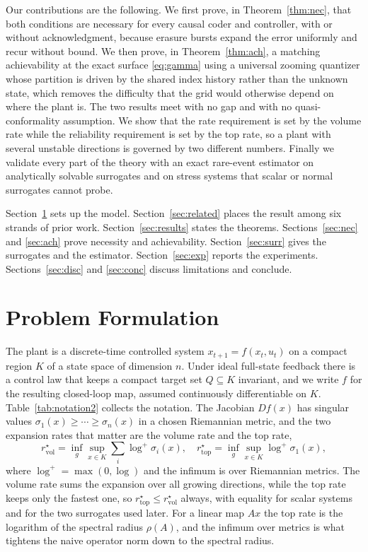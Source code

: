 \documentclass[journal]{IEEEtran}
\theoremstyle{definition}
\theoremstyle{remark}
\newcommand{\rvol}{r^\star_{\mathrm{vol}}}
\newcommand{\rtop}{r^\star_{\mathrm{top}}}
\begin{document}
Our contributions are the following. We first prove, in Theorem~\ref{thm:nec}, that both conditions are necessary
for every causal coder and controller, with or without acknowledgment, because erasure bursts expand the error
uniformly and recur without bound. We then prove, in Theorem~\ref{thm:ach}, a matching achievability at the exact
surface \eqref{eq:gamma} using a universal zooming quantizer whose partition is driven by the shared index
history rather than the unknown state, which removes the difficulty that the grid would otherwise depend on where
the plant is. The two results meet with no gap and with no quasi-conformality assumption. We show that the rate
requirement is set by the volume rate while the reliability requirement is set by the top rate, so a plant with
several unstable directions is governed by two different numbers. Finally we validate every part of the theory
with an exact rare-event estimator on analytically solvable surrogates and on stress systems that scalar or
normal surrogates cannot probe.

Section~\ref{sec:model} sets up the model. Section~\ref{sec:related} places the result among six strands of prior
work. Section~\ref{sec:results} states the theorems. Sections~\ref{sec:nec} and \ref{sec:ach} prove necessity and
achievability. Section~\ref{sec:surr} gives the surrogates and the estimator. Section~\ref{sec:exp} reports the
experiments. Sections~\ref{sec:disc} and \ref{sec:conc} discuss limitations and conclude.

\section{Problem Formulation}\label{sec:model}
The plant is a discrete-time controlled system $x_{t+1}=f(x_t,u_t)$ on a compact region $K$ of a state space of
dimension $n$. Under ideal full-state feedback there is a control law that keeps a compact target set $Q\subseteq
K$ invariant, and we write $f$ for the resulting closed-loop map, assumed continuously differentiable on $K$.
Table~\ref{tab:notation2} collects the notation. The Jacobian $Df(x)$ has singular values $\sigma_1(x)\ge\cdots
\ge\sigma_n(x)$ in a chosen Riemannian metric, and the two expansion rates that matter are the volume rate and
the top rate,
\begin{equation}
\rvol=\inf_g\sup_{x\in K}\sum_{i}\log^{+}\sigma_i(x),\quad
\rtop=\inf_g\sup_{x\in K}\log^{+}\sigma_1(x), \label{eq:rates}
\end{equation}
where $\log^{+}=\max(0,\log)$ and the infimum is over Riemannian metrics. The volume rate sums the expansion over
all growing directions, while the top rate keeps only the fastest one, so $\rtop\le\rvol$ always, with equality
for scalar systems and for the two surrogates used later. For a linear map $Ax$ the top rate is the logarithm of
the spectral radius $\rho(A)$, and the infimum over metrics is what tightens the naive operator norm down to the
spectral radius.
\end{document}
